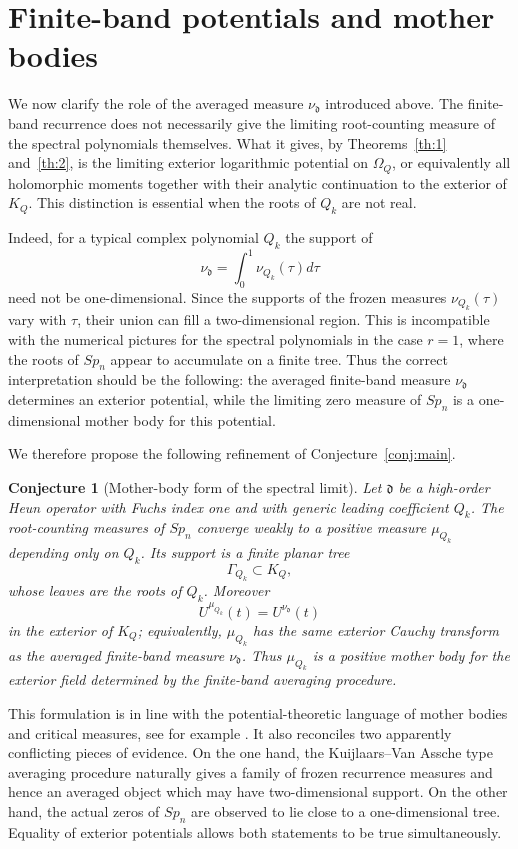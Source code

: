 \documentclass[10pt,twoside,a4paper,reqno]{amsart}
\theoremstyle{plain}
\newtheorem{conj}           {Conjecture}
\theoremstyle{definition}
\theoremstyle{remark}
\newenvironment{conjecture}{\begin{conj}}{\end{conj}}
\newcommand {\dq}{\mathfrak d}
\begin{document}
\section{Finite-band potentials and mother bodies}
\label{sec:mother-body}

We now clarify the role of the averaged measure $\nu_\dq$ introduced above.  The finite-band recurrence does not necessarily give the limiting root-counting measure of the spectral polynomials themselves.  What it gives, by Theorems~\ref{th:1} and~\ref{th:2}, is the limiting exterior logarithmic potential on $\Omega_Q$, or equivalently all holomorphic moments together with their analytic continuation to the exterior of $K_Q$.  This distinction is essential when the roots of $Q_k$ are not real.

Indeed, for a typical complex polynomial $Q_k$ the support of
\[
        \nu_\dq=\int_0^1\nu_{Q_k}(\tau)d\tau
\]
need not be one-dimensional.  Since the supports of the frozen measures $\nu_{Q_k}(\tau)$ vary with $\tau$, their union can fill a two-dimensional region.  This is incompatible with the numerical pictures for the spectral polynomials in the case $r=1$, where the roots of $Sp_n$ appear to accumulate on a finite tree.  Thus the correct interpretation should be the following: the averaged finite-band measure $\nu_\dq$ determines an exterior potential, while the limiting zero measure of $Sp_n$ is a one-dimensional mother body for this potential.


\medskip

We therefore propose the following refinement of Conjecture~\ref{conj:main}.


\begin{conjecture}[Mother-body form of the spectral limit]
\label{conj:mother-body}
Let $\dq$ be a high-order Heun operator with Fuchs index one and with generic
leading coefficient $Q_k$.  The root-counting measures of $Sp_n$ converge weakly
to a positive measure $\mu_{Q_k}$ depending only on $Q_k$.  Its support is a
finite planar tree
\[
        \Gamma_{Q_k}\subset K_Q,
\]
whose leaves are the roots of $Q_k$.  Moreover
\[
        U^{\mu_{Q_k}}(t)=U^{\nu_\dq}(t)
\]
in the exterior of $K_Q$; equivalently, $\mu_{Q_k}$ has the same exterior Cauchy
transform as the averaged finite-band measure $\nu_\dq$.  Thus $\mu_{Q_k}$ is a
positive mother body for the exterior field determined by the finite-band
averaging procedure.
\end{conjecture}

This formulation is in line with the potential-theoretic language of mother bodies and critical measures, see for example \cite{BoShMother,MFR,KS}.  It also reconciles two apparently conflicting pieces of evidence.  On the one hand, the Kuijlaars--Van Assche type averaging procedure naturally gives a family of frozen recurrence measures and hence an averaged object which may have two-dimensional support.  On the other hand, the actual zeros of $Sp_n$ are observed to lie close to a one-dimensional tree.  Equality of exterior potentials allows both statements to be true simultaneously.
\end{document}
